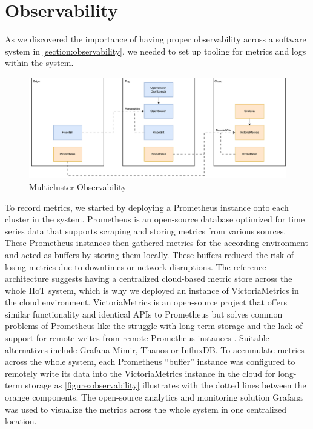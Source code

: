     \section{Observability}
    \label{section:observability-poc-setup}

        As we discovered the importance of having proper observability across a software system in \autoref{section:observability}, we needed to set up tooling for metrics and logs within the system.\newline

        \begin{figure}[htbp]
            \centering
            \includegraphics[width=\textwidth]{img/observability.pdf}
            \caption{Multicluster Observability}
            \label{figure:observability}
        \end{figure}

        \noindent To record metrics, we started by deploying a Prometheus instance onto each cluster in the system. Prometheus is an open-source database optimized for time series data that supports scraping and storing metrics from various sources. These Prometheus instances then gathered metrics for the according environment and acted as buffers by storing them locally. These buffers reduced the risk of losing metrics due to downtimes or network disruptions. The reference architecture suggests having a centralized cloud-based metric store across the whole IIoT system, which is why we deployed an instance of VictoriaMetrics in the cloud environment. VictoriaMetrics is an open-source project that offers similar functionality and identical APIs to Prometheus but solves common problems of Prometheus like the struggle with long-term storage and the lack of support for remote writes from remote Prometheus instances \cite{victoriametrics}. Suitable alternatives include Grafana Mimir, Thanos or InfluxDB. To accumulate metrics across the whole system, each Prometheus ``buffer'' instance was configured to remotely write its data into the VictoriaMetrics instance in the cloud for long-term storage as \autoref{figure:observability} illustrates with the dotted lines between the orange components. The open-source analytics and monitoring solution Grafana was used to visualize the metrics across the whole system in one centralized location. \newline

